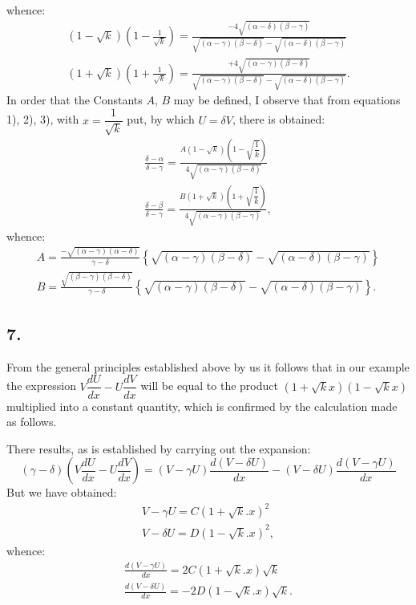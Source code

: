 \documentclass{article}
\begin{document}
whence:
\[
\begin{gathered}
(1-\sqrt{k})\left(1-\frac{1}{\sqrt{k}}\right)=\frac{-4\sqrt{(\alpha-\delta)(\beta-\gamma)}}{\sqrt{(\alpha-\gamma)(\beta-\delta)}-\sqrt{(\alpha-\delta)(\beta-\gamma)}}\\
(1+\sqrt{k})\left(1+\frac{1}{\sqrt{k}}\right)=\frac{+4\sqrt{(\alpha-\gamma)(\beta-\delta)}}{\sqrt{(\alpha-\gamma)(\beta-\delta)}-\sqrt{(\alpha-\delta)(\beta-\gamma)}}.
\end{gathered}
\]
In order that the Constants $A$, $B$ may be defined, I observe that from equations 1), 2), 3), with $x=\dfrac{1}{\sqrt{k}}$ put, by which $U=\delta V$, there is obtained:
\[
\begin{gathered}
\frac{\delta-\alpha}{\delta-\gamma}=\frac{A(1-\sqrt{k})\left(1-\sqrt{\dfrac{1}{k}}\right)}{4\sqrt{(\alpha-\gamma)(\beta-\delta)}}\\
\frac{\delta-\beta}{\delta-\gamma}=\frac{B(1+\sqrt{k})\left(1+\sqrt{\dfrac{1}{k}}\right)}{4\sqrt{(\alpha-\gamma)(\beta-\gamma)}},
\end{gathered}
\]
whence:
\[
\begin{gathered}
A=\frac{-\sqrt{(\alpha-\gamma)(\alpha-\delta)}}{\gamma-\delta}\left\{\sqrt{(\alpha-\gamma)(\beta-\delta)}-\sqrt{(\alpha-\delta)(\beta-\gamma)}\right\}\\
B=\frac{\sqrt{(\beta-\gamma)(\beta-\delta)}}{\gamma-\delta}\left\{\sqrt{(\alpha-\gamma)(\beta-\delta)}-\sqrt{(\alpha-\delta)(\beta-\gamma)}\right\}.
\end{gathered}
\]

\subsection*{7.}

From the general principles established above by us it follows that in our example the expression $V\dfrac{dU}{dx}-U\dfrac{dV}{dx}$ will be equal to the product $(1+\sqrt{k}x)(1-\sqrt{k}x)$ multiplied into a constant quantity, which is confirmed by the calculation made as follows.

There results, as is established by carrying out the expansion:
\[
(\gamma-\delta)\left(V\frac{dU}{dx}-U\frac{dV}{dx}\right)=(V-\gamma U)\frac{d(V-\delta U)}{dx}-(V-\delta U)\frac{d(V-\gamma U)}{dx}
\]
But we have obtained:
\[
\begin{gathered}
V-\gamma U=C(1+\sqrt{k}.x)^{2}\\
V-\delta U=D(1-\sqrt{k}.x)^{2},
\end{gathered}
\]
whence:
\[
\begin{gathered}
\frac{d(V-\gamma U)}{dx}=2C(1+\sqrt{k}.x)\sqrt{k}\\
\frac{d(V-\delta U)}{dx}=-2D(1-\sqrt{k}.x)\sqrt{k}.
\end{gathered}
\]
\end{document}
